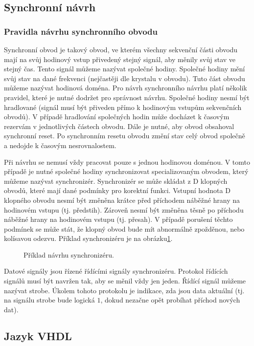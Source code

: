 \documentclass{report}
\begin{document}
\subsection{Synchronní návrh}\label{sec:synchronniaasynchronninavrh}
\subsubsection{Pravidla návrhu synchronního obvodu}
Synchronní obvod je takový obvod, ve kterém všechny sekvenční části obvodu mají na svůj hodinový vstup přivedený stejný signál, aby měnily svůj stav ve stejný čas. Tento signál můžeme nazývat společné hodiny. Společné hodiny mění svůj stav na dané frekvenci (nejčastěji dle krystalu v obvodu). Tuto část obvodu můžeme nazývat hodinová doména. Pro návrh synchronního návrhu platí několik pravidel, které je nutné dodržet pro správnost návrhu. Společné hodiny nesmí být hradlované (signál musí být přiveden přímo k hodinovým vstupům sekvenčních obvodů). V případě hradlování společných hodin může docházet k časovým rezervám v jednotlivých částech obvodu. Dále je nutné, aby obvod obsahoval synchronní reset. Po synchronním resetu obvodu změní stav celý obvod společně a nedojde k časovým nesrovnalostem. \par
Při návrhu se nemusí vždy pracovat pouze s jednou hodinovou doménou. V tomto případě je nutné společné hodiny synchronizovat specializovaným obvodem, který můžeme nazývat synchronizér. Synchronizér se může skládat z D klopných obvodů, které mají dané podmínky pro korektní funkci. Vstupní hodnota D klopného obvodu nesmí být změněna krátce před příchodem náběžné hrany na hodinovém vstupu (tj. předstih). Zároveň nesmí být změněna těsně po příchodu náběžné hrany na hodinovém vstupu (tj. přesah). V případě porušení těchto podmínek se může stát, že klopný obvod bude mít abnormálně zpožděnou, nebo kolísavou odezvu. Příklad synchronizéru je na obrázku\ref{fig:synchronizer}.
\begin{figure}
\centering
\caption{Příklad návrhu synchronizéru.}
\label{fig:synchronizer}
\end{figure}
\par
Datové signály jsou řízené řídícími signály synchronizéru. Protokol řídících signálů musí být navržen tak, aby se měnil vždy jen jeden. Řídící signál můžeme nazývat strobe. Úkolem tohoto protokolu je indikace, zda jsou data aktuální (tj. na signálu strobe bude logická $1$, dokud nezačne opět probíhat příchod nových dat).
\subsection{Jazyk VHDL}\label{sec:jazykvhdl}
\end{document}
